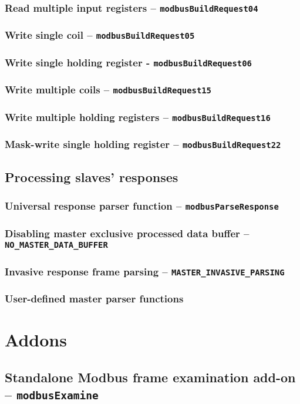 \documentclass[11pt,a4paper]{article}
\begin{document}
\subsubsection{Read multiple input registers -- \texttt{modbusBuildRequest04}}\label{sec:modbusBuildRequest04}
\subsubsection{Write single coil -- \texttt{modbusBuildRequest05}}\label{sec:modbusBuildRequest05}
\subsubsection{Write single holding register - \texttt{modbusBuildRequest06}}\label{sec:modbusBuildRequest06}
\subsubsection{Write multiple coils -- \texttt{modbusBuildRequest15}}\label{sec:modbusBuildRequest15}
\subsubsection{Write multiple holding registers -- \texttt{modbusBuildRequest16}} \label{sec:modbusBuildRequest16}
\subsubsection{Mask-write single holding register -- \texttt{modbusBuildRequest22}}\label{sec:modbusBuildRequest22}

\subsection{Processing slaves' responses}
\subsubsection{Universal response parser function -- \texttt{modbusParseResponse}} \label{sec:modbusParseResponse}
\subsubsection{Disabling master exclusive processed data buffer -- \texttt{NO\_MASTER\_DATA\_BUFFER}} \label{sec:no-master-data-buffer}
\subsubsection{Invasive response frame parsing -- \texttt{MASTER\_INVASIVE\_PARSING}} \label{sec:master-invasive-parsing}
\subsubsection{User-defined master parser functions} \label{sec:master-user-functions}

\section{Addons}
\subsection{Standalone Modbus frame examination add-on -- \texttt{modbusExamine}} \label{sec:modbusExamine}
\end{document}
